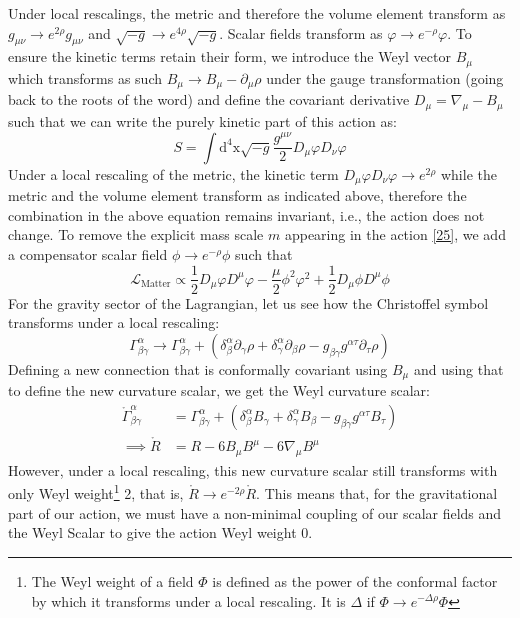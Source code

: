 \documentclass[aps,prd,reprint,preprintnumbers,showpacs,floatfix,nofootinbib,superscript address]{revtex4-2}
\begin{document}

Under local rescalings, the metric and therefore the volume element transform as $g_{\mu\nu} \rightarrow e^{2\rho} g_{\mu\nu} $ and $\sqrt{-g} \rightarrow e^{4\rho} \sqrt{-g}$. Scalar fields transform as $\varphi \rightarrow e^{-\rho}\varphi$. To ensure the kinetic terms retain their form, we introduce the Weyl vector $B_\mu$ which transforms as such $B_{\mu} \rightarrow B_\mu - \partial_\mu \rho$ under the gauge transformation (going back to the roots of the word) and define the covariant derivative $D_\mu = \nabla_\mu - B_\mu$ such that we can write the purely kinetic part of this action as:
\[
    S = \int \text{d}^4 \text{x} \sqrt{-g} \frac{g^{\mu\nu}}{2} D_\mu \varphi D_\nu \varphi
\]
Under a local rescaling of the metric, the kinetic term $D_\mu \varphi D_\nu \varphi \rightarrow e^{2\rho}$ while the metric and the volume element transform as indicated above, therefore the combination in the above equation remains invariant, i.e., the action does not change. To remove the explicit mass scale $m$ appearing in the action \ref{25}, we add a compensator scalar field $\phi \rightarrow e^{-\rho}\phi$ such that
\[
\mathcal{L}_\text{Matter} \propto \frac{1}{2} D_\mu \varphi D^\mu \varphi - \frac{\mu}{2} \phi^2 \varphi^2 + \frac{1}{2} D_\mu \phi D^\mu \phi 
\]
For the gravity sector of the Lagrangian, let us see how the Christoffel symbol transforms under a local rescaling:
\[
    \Gamma^{\alpha}_{\beta \gamma} \rightarrow \Gamma^{\alpha}_{\beta \gamma} +(\delta^{\alpha}_{\beta} \partial_\gamma \rho + \delta^{\alpha}_{\gamma} \partial_{\beta} \rho - g_{\beta \gamma}g^{\alpha \tau}\partial_{\tau}\rho)
\]
Defining a new connection that is conformally covariant using $B_\mu$ and using that to define the new curvature scalar, we get the Weyl curvature scalar:
\begin{align}
    \mathring{\Gamma}^{\alpha}_{\beta \gamma} &= \Gamma^{\alpha}_{\beta \gamma} + (\delta^{\alpha}_{\beta} B_{\gamma} + \delta^{\alpha}_{\gamma} B_{\beta} - g_{\beta \gamma}g^{\alpha \tau}B_{\tau}) \nonumber \\
    \implies \mathring{R} &= R - 6 B_{\mu} B^{\mu} - 6 \nabla_\mu B^\mu
\end{align}
However, under a local rescaling, this new curvature scalar still transforms with only Weyl weight\footnote{The Weyl weight of a field $\Phi$ is defined as the power of the conformal factor by which it transforms under a local rescaling. It is $\Delta$ if $\Phi \rightarrow e^{-\Delta\rho}\Phi$} 2, that is, $\mathring{R} \rightarrow e^{-2\rho} \mathring{R}$. This means that, for the gravitational part of our action, we must have a non-minimal coupling of our scalar fields and the Weyl Scalar to give the action Weyl weight 0.
\end{document}
